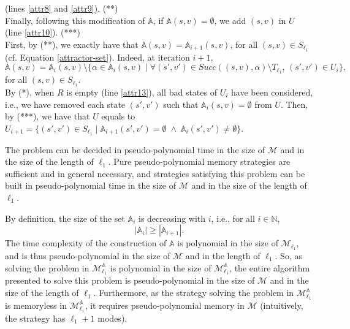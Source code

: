 \begin{proof2}
(lines \ref{attr8} and \ref{attr9}).
 {\color{umons-red}(**)}\\
Finally, following this modification of $\mathbb{A}$, if $\mathbb{A}(s, v) = \emptyset$, we add $(s, v)$ in $U$ (line \ref{attr10}). {\color{umons-red}(***)}\\
First, by {\color{umons-red}(**)}, we exactly have that $\mathbb{A}(s, v) = \mathbb{A}_{i+1}(s, v)$, for all $(s, v) \in S_{\ell_1}$ (cf. Equation \ref{attractor-set}). Indeed, at iteration $i+1$, \[\mathbb{A}(s, v) = \mathbb{A}_{i}(s, v) \setminus
\{ \alpha \in \mathbb{A}_{i}(s, v) \; | \; \forall (s', v') \in Succ((s, v), \alpha) \setminus T_{\ell_1}, \, (s', v') \in U_i\},\]
for all $(s, v) \in S_{\ell_1}$.\\
By {\color{umons-red}(*)}, when $R$ is empty (line \ref{attr13}), all bad states of $U_i$ have been considered, i.e., we have removed each state $(s', v')$ such that $\mathbb{A}_{i}(s, v) = \emptyset$ from $U$.
Then, by {\color{umons-red}(***)}, we have that $U$ equals to $U_{i+1} = \{(s', v') \in S_{\ell_1} \; | \; \mathbb{A}_{i+1}(s', v') = \emptyset \; \wedge \; \mathbb{A}_{i}(s', v') \neq \emptyset  \}$.

\end{proof2}

\begin{theorem}
  The \SSPWE{} problem can be decided in pseudo-polynomial time in the size of $\mathcal{M}$ and in the size of the length of $\ell_1$.
  Pure pseudo-polynomial memory strategies are sufficient and in general necessary, and strategies satisfying this problem can be built in pseudo-polynomial time in the size of $\mathcal{M}$ and in the size of the length of $\ell_1$.
\end{theorem}

By definition, the size of the set $\mathbb{A}_i$ is decreasing with $i$, i.e., for all $i \in \mathbb{N}$,
\[
  | \mathbb{A}_i | \geq | \mathbb{A}_{i+1} |.
\]
The time complexity of the construction of $\mathbb{A}$ is polynomial in the size of $\mathcal{M}_{\ell_1}$, and is thus pseudo-polynomial in the size of $\mathcal{M}$ and in the length of $\ell_1$.
So, as solving the \SSPE{} problem in $\mathcal{M}^\mathbb{A}_{\ell_1}$ is polynomial in the size of $\mathcal{M}^\mathbb{A}_{\ell_1}$,
the entire algorithm presented to solve this problem is pseudo-polynomial in the size of $\mathcal{M}$ and in the size of the length of $\ell_1$.
Furthermore, as the strategy solving the \SSPE{} problem in $\mathcal{M}_{\ell_1}^\mathbb{A}$ is memoryless in $\mathcal{M}_{\ell_1}^\mathbb{A}$, it requires pseudo-polynomial memory in $\mathcal{M}$ (intuitively, the strategy has $\ell_1 + 1$ modes).

